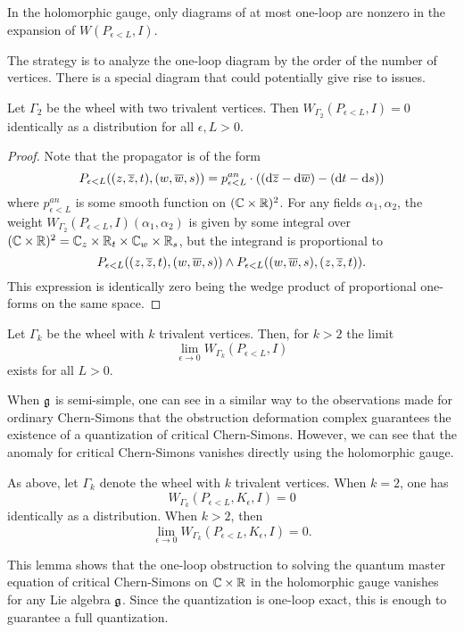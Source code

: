 \documentclass[11pt]{amsart}
\begin{document}
\begin{lem}
In the holomorphic gauge, only diagrams of at most one-loop are nonzero in the expansion of $W(P_{\epsilon < L}, I)$. 
\end{lem}

The strategy is to analyze the one-loop diagram by the order of the number of vertices. 
There is a special diagram that could potentially give rise to issues. 

\begin{lem}
Let $\Gamma_2$ be the wheel with two trivalent vertices. 
Then $W_{\Gamma_2}(P_{\epsilon < L}, I) = 0$ identically as a distribution for all $\epsilon , L > 0$. 
\end{lem}
\begin{proof}
Note that the propagator is of the form
\[
P_{\epsilon < L} ((z,\overline{z}, t), (w,\overline{w}, s)) = p^{an}_{\epsilon < L} \cdot \left(({\rm d} \overline{z} - {\rm d} \overline{w}) - ({\rm d} t - {\rm d} s)\right)
\]
where $p^{an}_{\epsilon < L}$ is some smooth function on $(\mathbb C \times \mathbb R)^2$. 
For any fields $\alpha_1,\alpha_2$, the weight $W_{\Gamma_2}(P_{\epsilon < L}, I)(\alpha_1,\alpha_2)$ is given by some integral over $(\mathbb C \times \mathbb R)^2 = \mathbb C_z \times \mathbb R_t \times \mathbb C_{w} \times \mathbb R_s$, but the integrand is proportional to 
\[
P_{\epsilon < L} ((z,\overline{z}, t), (w,\overline{w}, s)) \wedge P_{\epsilon < L} ((w,\overline{w}, s), (z, \overline{z}, t)) .
\]
This expression is identically zero being the wedge product of proportional one-forms on the same space.
\end{proof}

\begin{lem}
Let $\Gamma_k$ be the wheel with $k$ trivalent vertices. 
Then, for $k > 2$ the limit
\[
\lim_{\epsilon \to 0} W_{\Gamma_k} (P_{\epsilon < L}, I)
\]
exists for all $L > 0$.
\end{lem}

When $\mathfrak g$ is semi-simple, one can see in a similar way to the observations made for ordinary Chern-Simons that the obstruction deformation complex guarantees the existence of a quantization of critical Chern-Simons. 
However, we can see that the anomaly for critical Chern-Simons vanishes directly using the holomorphic gauge. 

\begin{lem}
As above, let $\Gamma_k$ denote the wheel with $k$ trivalent vertices. 
When $k=2$, one has
\[
W_{\Gamma_k} (P_{\epsilon < L}, K_\epsilon , I) = 0
\]
identically as a distribution. 
When $k > 2$, then
\[
\lim_{\epsilon \to 0} W_{\Gamma_k} (P_{\epsilon < L}, K_\epsilon , I) = 0 .
\]
\end{lem}

This lemma shows that the one-loop obstruction to solving the quantum master equation of critical Chern-Simons on $\mathbb C \times \mathbb R$ in the holomorphic gauge vanishes for any Lie algebra $\mathfrak g$. 
Since the quantization is one-loop exact, this is enough to guarantee a full quantization. 
\end{document}
